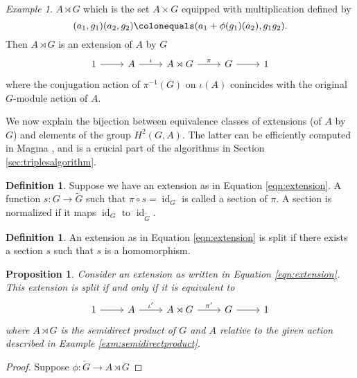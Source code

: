 \documentclass{dcthesis}
\newcommand{\defi}[1]{\textsf{#1}}
\newcommand{\wt}[1]{\widetilde{#1}}
\DeclareMathOperator{\id}{id}
\numberwithin{equation}{section}
\newtheorem{prop}[equation]{Proposition}
\theoremstyle{definition}
\newtheorem{definition}[equation]{Definition}
\theoremstyle{remark}
\newtheorem{example}[equation]{Example}
\begin{document}
{{\begin{example}
      $A\rtimes G$ which is the set
      $A\times G$ equipped with multiplication
      defined by
      \[
        (a_1,g_1)(a_2,g_2)\colonequals
        (a_1+\phi(g_1)(a_2), g_1g_2).
      \]
      Then $A\rtimes G$
      is an extension of $A$ by $G$
      \[
        \begin{tikzcd}
          1\arrow{r}&A\arrow{r}{\iota}&A\rtimes G\arrow{r}{\pi}&G\arrow{r}&1
        \end{tikzcd}
      \]
      where the conjugation action of $\pi^{-1}(G)$
      on $\iota(A)$
      conincides with the original $G$-module action of $A$.
    \end{example}
    We now explain the bijection between
    equivalence classes of extensions
    (of $A$ by $G$)
    and elements of the group
    $H^2(G,A)$.
    The latter
    can be efficiently computed in \textsf{Magma}
    \cite{magmabook},
    and is a crucial part of the algorithms
    in
    Section \ref{sec:triplesalgorithm}.
    \begin{definition}
      \label{def:section}
      Suppose we have an extension
      as in Equation \ref{eqn:extension}.
      A function $s\colon G\to\wt{G}$
      such that $\pi\circ s = \id_G$
      is called a
      \defi{section}
      of $\pi$.
      A section is
      \defi{normalized}
      if it maps $\id_G$
      to
      $\id_{\wt{G}}$.
    \end{definition}
    \begin{definition}
      \label{def:splitextension}
      An extension as in Equation \ref{eqn:extension}
      is \defi{split}
      if there exists a section $s$ such that
      $s$ is a homomorphism.
    \end{definition}
    \begin{prop}
      \label{prop:splitextensions}
      Consider an extension as written in
      Equation \ref{eqn:extension}.
      This extension is split
      if and only if
      it is equivalent to
      \[
        \begin{tikzcd}
          1\arrow{r}&A\arrow{r}{\iota'}
                    &A\rtimes G\arrow{r}{\pi'}
                    &G\arrow{r}&1
        \end{tikzcd}
      \]
      where $A\rtimes G$ is the semidirect product
      of $G$ and $A$ relative to the given action
      described in
      Example \ref{exm:semidirectproduct}.
    \end{prop}
    \begin{proof}
      Suppose $\phi\colon\wt{G}\to A\rtimes G$

\end{proof}}}
\end{document}
